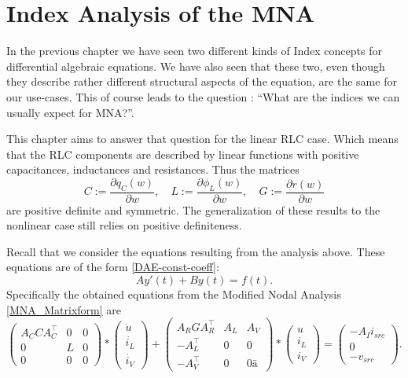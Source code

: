 \chapter{Index Analysis of the MNA}

\cite{ModellingAndDiscretizationOfCircuitProblems}

In the previous chapter we have seen two different kinds of Index concepts for differential algebraic equations. We have also seen that these two, even though they describe rather different structural aspects of the equation, are the same for our use-cases. This of course leads to the question : ``What are the indices we can usually expect for MNA?''.

This chapter aims to answer that question for the linear RLC case. Which means that the RLC components are described by linear functions with positive capacitances, inductances and resistances. Thus the matrices
\begin{displaymath}
	C:=\frac{\partial q_C(w)}{\partial w}, \quad L:=\frac{\partial \phi_L(w)}{\partial w}, \quad G:=\frac{\partial r(w)}{\partial w}
\end{displaymath}
are positive definite and symmetric. The generalization of these results to the nonlinear case still relies on positive definiteness.

Recall that we consider the equations resulting from the analysis above. These equations are of the form \ref{DAE-const-coeff}:
\begin{displaymath}
	A y'(t) + B y(t) = f(t).
\end{displaymath}
Specifically the obtained equations from the Modified Nodal Analysis \ref{MNA_Matrixform} are
\begin{displaymath}
	\begin{pmatrix}
		A_C C A_C^\top & 0 & 0 \\
		0 & L & 0 \\
		0 & 0 & 0
	\end{pmatrix}
	*
	\begin{pmatrix}
		\dot{u} \\
		\dot{i_L} \\
		\dot{i_V}
	\end{pmatrix}
	+
	\begin{pmatrix}
		A_R G A_R^\top & A_L & A_V \\
		-A_L^\top & 0 & 0 \\
		-A_V^\top & 0 & 0 ä
	\end{pmatrix}
	*
	\begin{pmatrix}
		u \\
		i_L \\
		i_V
	\end{pmatrix}
	=
	\begin{pmatrix}
		-A_I i_{src} \\
		0 \\
		-v_{src}
	\end{pmatrix}.
\end{displaymath}


